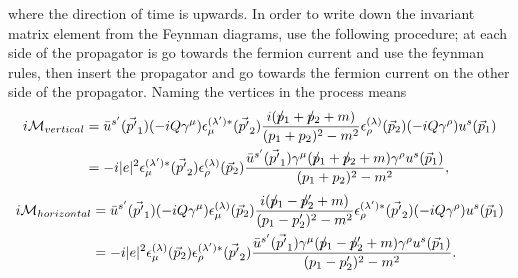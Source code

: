 \begin{example}
\begin{center}
		
	\end{center}
	where the direction of time is upwards. In order to write down the invariant matrix element from the Feynman diagrams, use the following procedure; at each side of the propagator is go towards the fermion current and use the feynman rules, then insert the propagator and go towards the fermion current on the other side of the propagator. Naming the vertices in the process means
	\begin{equation}
		\begin{split}
			i\mathcal{M}_{vertical}&=\bar{u}^{s'}(\vec{p'}_1)(-iQ\gamma^\mu)\epsilon^{(\lambda')*}_{\mu}(\vec{p'}_2)\frac{i(\slashed p_1+\slashed p_2+m)}{(p_1+p_2)^2-m^2}\epsilon^{(\lambda)}_{\rho}(\vec{p}_2)(-iQ\gamma^\rho)
			u^s(\vec{p}_1)\\
			&=-i|e|^2\epsilon^{(\lambda')*}_{\mu}(\vec{p'}_2)\epsilon^{(\lambda)}_{\rho}(\vec{p}_2)\frac{\bar{u}^{s'}(\vec{p'}_1)\gamma^\mu(\slashed p_1+\slashed p_2+m)\gamma^\rho u^s(\vec{p}_1)}{(p_1+p_2)^2-m^2},
		\end{split}
		\label{M1}
	\end{equation} 
	\begin{equation}
		\begin{split}
			i\mathcal{M}_{horizontal}&=\bar{u}^{s'}(\vec{p'}_1)(-iQ\gamma^\mu)\epsilon^{(\lambda)}_{\mu}(\vec{p}_2)\frac{i(\slashed p_1-\slashed p'_2+m)}{(p_1-p'_2)^2-m^2}\epsilon^{(\lambda')*}_{\rho}(\vec{p'}_2)(-iQ\gamma^\rho)
			u^s(\vec{p}_1)\\
			&=-i|e|^2\epsilon^{(\lambda)}_{\mu}(\vec{p}_2)\epsilon^{(\lambda')*}_{\rho}(\vec{p'}_2)\frac{\bar{u}^{s'}(\vec{p'}_1)\gamma^\mu(\slashed p_1-\slashed p'_2+m)\gamma^\rho
				u^s(\vec{p}_1)}{(p_1-p'_2)^2-m^2}.
		\end{split}
		\label{M2}
	\end{equation} 
	

\end{example}
